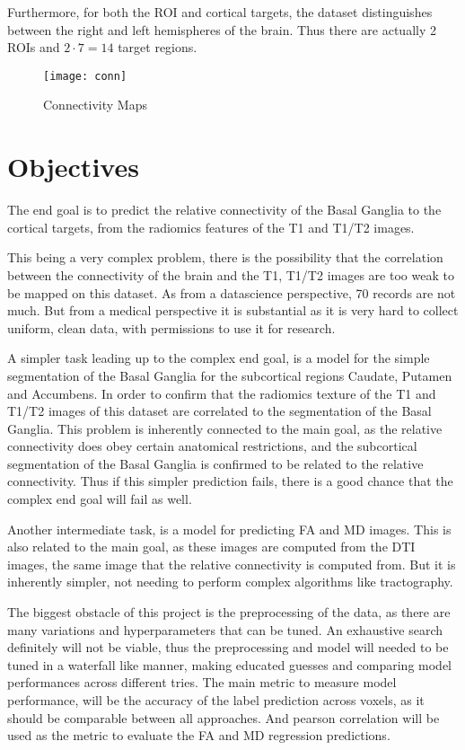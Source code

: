 Furthermore, for both the \ac{ROI} and cortical targets, the dataset distinguishes between the right and left hemispheres of the brain. Thus there are actually 2 \ac{ROI}s and $2 \cdot 7=14$ target regions.

\begin{figure}[H]
\centering
\texttt{[image: conn]}
\caption{Connectivity Maps}
\label{fig:conn}
\end{figure}

\section{Objectives}

The end goal is to predict the relative connectivity of the Basal Ganglia to the cortical targets, from the radiomics features of the T1 and T1/T2 images.\par

This being a very complex problem, there is the possibility that the correlation between the connectivity of the brain and the T1, T1/T2 images are too weak to be mapped on this dataset. As from a datascience perspective, 70 records are not much. But from a medical perspective it is substantial as it is very hard to collect uniform, clean data, with permissions to use it for research.\par

A simpler task leading up to the complex end goal, is a model for the simple segmentation of the Basal Ganglia for the subcortical regions Caudate, Putamen and Accumbens. In order to confirm that the radiomics texture of the T1 and T1/T2 images of this dataset are correlated to the segmentation of the Basal Ganglia. This problem is inherently connected to the main goal, as the relative connectivity does obey certain anatomical restrictions, and the subcortical segmentation of the Basal Ganglia is confirmed to be related to the relative connectivity. Thus if this simpler prediction fails, there is a good chance that the complex end goal will fail as well.\par

Another intermediate task, is a model for predicting \ac{FA} and \ac{MD} images. This is also related to the main goal, as these images are computed from the \ac{DTI} images, the same image that the relative connectivity is computed from. But it is inherently simpler, not needing to perform complex algorithms like tractography.\par

The biggest obstacle of this project is the preprocessing of the data, as there are many variations and hyperparameters that can be tuned. An exhaustive search definitely will not be viable, thus the preprocessing and model will needed to be tuned in a waterfall like manner, making educated guesses and comparing model performances across different tries. The main metric to measure model performance, will be the accuracy of the label prediction across voxels, as it should be comparable between all approaches. And pearson correlation will be used as the metric to evaluate the \ac{FA} and \ac{MD} regression predictions.

